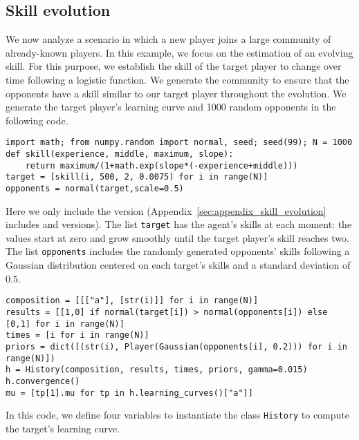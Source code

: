 \documentclass[article]{jss}
\begin{document}
\subsection{Skill evolution} \label{sec:skill_evolution}

We now analyze a scenario in which a new player joins a large community of already-known players. 
In this example, we focus on the estimation of an evolving skill. 
For this purpose, we establish the skill of the target player to change over time following a logistic function. 
We generate the community to ensure that the opponents have a skill similar to our target player throughout the evolution. 
We generate the target player's learning curve and 1000 random opponents in the following code. 
%
\begin{lstlisting}[captionpos=b,backgroundcolor=\color{python!60}, label=lst:simulated_skill, caption={Initialization of the target's learning curve and the community of opponents.}, belowskip=0cm]
import math; from numpy.random import normal, seed; seed(99); N = 1000
def skill(experience, middle, maximum, slope):
    return maximum/(1+math.exp(slope*(-experience+middle)))
target = [skill(i, 500, 2, 0.0075) for i in range(N)]
opponents = normal(target,scale=0.5)
\end{lstlisting}
%
Here we only include the  version (Appendix~\ref{sec:appendix_skill_evolution} includes  and  versions). 
The list \texttt{target} has the agent's skills at each moment: the values start at zero and grow smoothly until the target player's skill reaches two. 
The list \texttt{opponents} includes the randomly generated opponents' skills following a Gaussian distribution centered on each target's skills and a standard deviation of $0.5$. 
%
\begin{lstlisting}[captionpos=b,backgroundcolor=\color{python!60},label=lst:estimating_the_simulated, caption={Estimating the simulated learning curve from random results.}, belowskip=0cm]
composition = [[["a"], [str(i)]] for i in range(N)]
results = [[1,0] if normal(target[i]) > normal(opponents[i]) else [0,1] for i in range(N)]
times = [i for i in range(N)]
priors = dict([(str(i), Player(Gaussian(opponents[i], 0.2))) for i in range(N)])
h = History(composition, results, times, priors, gamma=0.015)
h.convergence()
mu = [tp[1].mu for tp in h.learning_curves()["a"]] 
\end{lstlisting}
%
In this code, we define four variables to instantiate the class \texttt{History} to compute the target's learning curve. 
\end{document}
